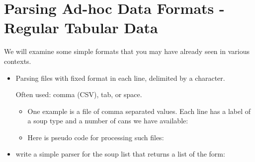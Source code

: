\documentclass[letterpaper,10pt,english]{sphinxmanual}
\begin{document}
\section{Parsing Ad-hoc Data Formats - Regular Tabular Data}
\label{\detokenize{lecture_notes/lec13_files_web:parsing-ad-hoc-data-formats-regular-tabular-data}}
We will examine some simple formats that you may have already seen in
various contexts.
\begin{itemize}
\item {} 
Parsing files with fixed format in each line, delimited by a
character.

Often used: comma (CSV), tab, or space.
\begin{itemize}
\item {} 
One example is a file of comma separated values. Each line has a label of a soup type and
a number of cans we have available:

\begin{sphinxVerbatim}[commandchars=\\\{\}]
  
  
\end{sphinxVerbatim}

\item {} 
Here is pseudo code for processing such files:

\begin{sphinxVerbatim}[commandchars=\\\{\}]
     
        
           
\end{sphinxVerbatim}

\end{itemize}

\item {} 
 write a simple parser for the soup list that returns a
list of the form:

\begin{sphinxVerbatim}[commandchars=\\\{\}]
\PYG{p}{[}    \PYG{p}{]}
\end{sphinxVerbatim}

\end{itemize}
\end{document}
